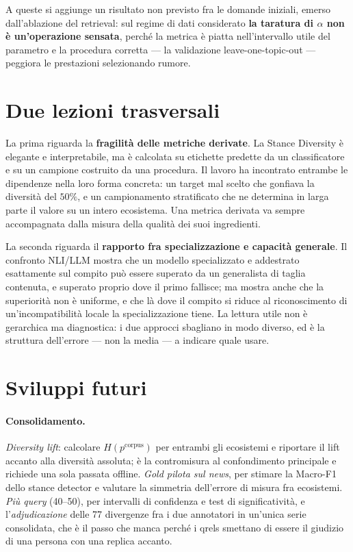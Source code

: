 \documentclass[11pt,a4paper]{report}
\begin{document}
A queste si aggiunge un risultato non previsto fra le domande iniziali, emerso dall'ablazione del
retrieval: sul regime di dati considerato \textbf{la taratura di $\alpha$ non è un'operazione
sensata}, perché la metrica è piatta nell'intervallo utile del parametro e la procedura corretta ---
la validazione leave-one-topic-out --- peggiora le prestazioni selezionando rumore.

\section{Due lezioni trasversali}
La prima riguarda la \textbf{fragilità delle metriche derivate}. La Stance Diversity è elegante e
interpretabile, ma è calcolata su etichette predette da un classificatore e su un campione
costruito da una procedura. Il lavoro ha incontrato entrambe le dipendenze nella loro forma
concreta: un target mal scelto che gonfiava la diversità del $50\%$, e un campionamento stratificato
che ne determina in larga parte il valore su un intero ecosistema. Una metrica derivata va sempre
accompagnata dalla misura della qualità dei suoi ingredienti.

La seconda riguarda il \textbf{rapporto fra specializzazione e capacità generale}. Il confronto
NLI/LLM mostra che un modello specializzato e addestrato esattamente sul compito può essere superato
da un generalista di taglia contenuta, e superato proprio dove il primo fallisce; ma mostra anche
che la superiorità non è uniforme, e che là dove il compito si riduce al riconoscimento di
un'incompatibilità locale la specializzazione tiene. La lettura utile non è gerarchica ma
diagnostica: i due approcci sbagliano in modo diverso, ed è la struttura dell'errore --- non la
media --- a indicare quale usare.

\section{Sviluppi futuri}\label{sec:futuri}
\paragraph{Consolidamento.} \emph{Diversity lift}: calcolare $H(p^{\text{corpus}})$ per entrambi gli
ecosistemi e riportare il lift accanto alla diversità assoluta; è la contromisura al confondimento
principale e richiede una sola passata offline. \emph{Gold pilota sul news}, per stimare la Macro-F1
dello stance detector e valutare la simmetria dell'errore di misura fra ecosistemi. \emph{Più query}
(40--50), per intervalli di confidenza e test di significatività, e l'\emph{adjudicazione} delle 77
divergenze fra i due annotatori in un'unica serie consolidata, che è il passo che manca perché i
qrels smettano di essere il giudizio di una persona con una replica accanto.
\end{document}
